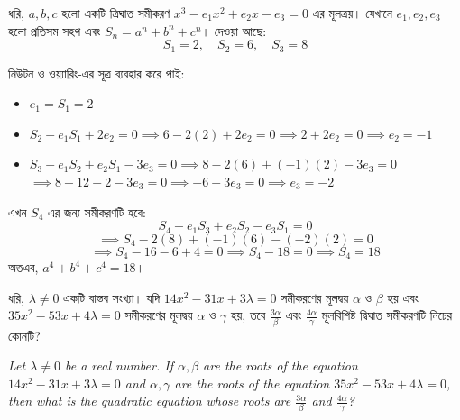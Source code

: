 \documentclass[12pt, a4paper]{article}
\begin{document}
\begin{tcolorbox}[solutionbox={সমাধান (Solution)}]
    \noindent
    ধরি, $a, b, c$ হলো একটি ত্রিঘাত সমীকরণ $x^3 - e_1 x^2 + e_2 x - e_3 = 0$ এর মূলত্রয়। 
    যেখানে $e_1, e_2, e_3$ হলো প্রতিসম সহগ এবং $S_n = a^n + b^n + c^n$। 
    দেওয়া আছে: 
    \[ S_1 = 2, \quad S_2 = 6, \quad S_3 = 8 \]
    
    \vspace{0.5em}
    নিউটন ও ওয়্যারিং-এর সূত্র ব্যবহার করে পাই:
    \begin{itemize}[itemsep=0.4em]
        \item $e_1 = S_1 = 2$
        \item $S_2 - e_1 S_1 + 2e_2 = 0 \implies 6 - 2(2) + 2e_2 = 0 \implies 2 + 2e_2 = 0 \implies e_2 = -1$
        \item $S_3 - e_1 S_2 + e_2 S_1 - 3e_3 = 0 \implies 8 - 2(6) + (-1)(2) - 3e_3 = 0$ \\
        $\implies 8 - 12 - 2 - 3e_3 = 0 \implies -6 - 3e_3 = 0 \implies e_3 = -2$
    \end{itemize}
    
    \vspace{0.5em}
    এখন $S_4$ এর জন্য সমীকরণটি হবে:
    \[ S_4 - e_1 S_3 + e_2 S_2 - e_3 S_1 = 0 \]
    \[ \implies S_4 - 2(8) + (-1)(6) - (-2)(2) = 0 \]
    \[ \implies S_4 - 16 - 6 + 4 = 0 \implies S_4 - 18 = 0 \implies S_4 = 18 \]
    অতএব, $a^4+b^4+c^4 = 18$।
\end{tcolorbox}
\begin{tcolorbox}[questionbox={প্রশ্ন (Question) 35}]
    \noindent
    ধরি, $\lambda \ne 0$ একটি বাস্তব সংখ্যা। যদি $14x^2 - 31x + 3\lambda = 0$ সমীকরণের মূলদ্বয় $\alpha$ ও $\beta$ হয় এবং $35x^2 - 53x + 4\lambda = 0$ সমীকরণের মূলদ্বয় $\alpha$ ও $\gamma$ হয়, তবে $\frac{3\alpha}{\beta}$ এবং $\frac{4\alpha}{\gamma}$ মূলবিশিষ্ট দ্বিঘাত সমীকরণটি নিচের কোনটি?
    
    \vspace{0.8em}
    \begin{english}
    \noindent\textit{\color{darkgray}
    Let $\lambda \ne 0$ be a real number. If $\alpha, \beta$ are the roots of the equation $14x^2 - 31x + 3\lambda = 0$ and $\alpha, \gamma$ are the roots of the equation $35x^2 - 53x + 4\lambda = 0$, then what is the quadratic equation whose roots are $\frac{3\alpha}{\beta}$ and $\frac{4\alpha}{\gamma}$?
    }
    \end{english}
\end{tcolorbox}
\end{document}
